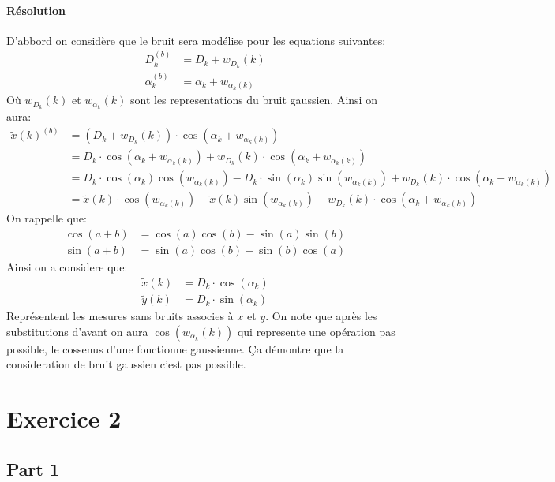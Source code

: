 \documentclass{article}
\begin{document}
\paragraph{Résolution}D'abbord on considère que le bruit sera modélise pour les equations suivantes:
\begin{align*}
    D_{k}^{(b)} &= D_{k} + w_{D_{k}}(k)\\
    \alpha_{k}^{(b)} &= \alpha_{k} + w_{\alpha_{k}(k)}
\end{align*}
Où $w_{D_{k}}(k)$ et $w_{\alpha_{k}}(k)$ sont les representations du bruit gaussien. Ainsi on aura:
\begin{align*}
    \tilde{x}(k)^{(b)} &= (D_{k} + w_{D_{k}}(k)) \cdot \cos(\alpha_{k} + w_{\alpha_{k}(k)})\\
    &= D_{k} \cdot \cos(\alpha_{k} + w_{\alpha_{k}(k)}) + w_{D_{k}}(k) \cdot \cos(\alpha_{k} + w_{\alpha_{k}(k)})\\
    &= D_{k} \cdot \cos(\alpha_{k})\cos(w_{\alpha_{k}(k)}) - D_{k} \cdot \sin(\alpha_{k})\sin(w_{\alpha_{k}(k)}) + w_{D_{k}}(k) \cdot \cos(\alpha_{k} + w_{\alpha_{k}(k)})\\
    &= \boxed{\tilde{x}(k) \cdot \cos(w_{\alpha_{k}(k)})} - \boxed{\tilde{x}(k)\sin(w_{\alpha_{k}(k)})} + w_{D_{k}}(k) \cdot \cos(\alpha_{k} + w_{\alpha_{k}(k)})
\end{align*}
On rappelle que:
\begin{align*}
    \cos(a + b) &= \cos(a)\cos(b) - \sin(a)\sin(b)\\
    \sin(a + b) &= \sin(a)\cos(b) + \sin(b)\cos(a)
\end{align*}
Ainsi on a considere que:
\begin{align*}
    \tilde{x}(k) &= D_{k} \cdot \cos(\alpha_{k})\\
    \tilde{y}(k) &= D_{k} \cdot \sin(\alpha_{k})
\end{align*}
Représentent les mesures sans bruits associes à $x$ et $y$. On note que après les substitutions d'avant on aura $\cos(w_{\alpha_{k}}(k))$ qui represente une opération pas possible, le cossenus d'une fonctionne gaussienne. Ça démontre que la consideration de bruit gaussien c'est pas possible.


\section{Exercice 2}
\subsection{Part 1}
\end{document}
